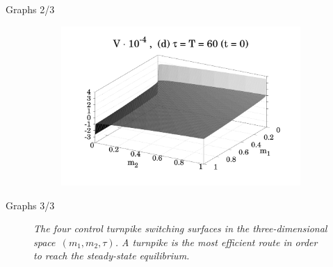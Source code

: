 \documentclass{beamer}
\begin{document}
\begin{frame}{Graphs 2/3}
\begin{figure}
\begin{subfigure}{.48 \textwidth}
            \label{fig_4_c}
        \end{subfigure}
        \begin{subfigure}{.48 \textwidth}
            \includegraphics[width = \textwidth]{figures/Figure_4d_1.pdf}
            \label{fig_4_d}
        \end{subfigure}
    \label{Fig_4}
    \end{figure}
\end{frame}

\begin{frame}{Graphs 3/3}
    \begin{figure}
        \bf \caption{\it The four control turnpike switching surfaces in the three-dimensional space~$ (m_1, m_2, \tau) $. A turnpike is the most efficient route in order to reach the steady-state equilibrium.}
        \label{Fig_7}
    \end{figure}
\end{frame}
\end{document}
